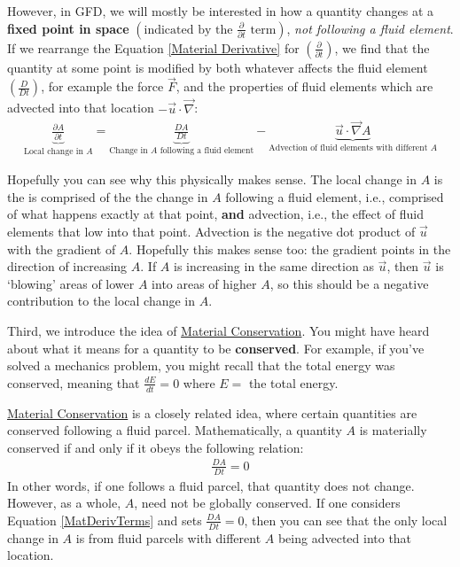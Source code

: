 However, in GFD, we will mostly be interested in how a quantity changes at a \textbf{fixed point in space} $\left(\text{indicated by the } \frac{\partial}{\partial t} \text{ term}\right)$, \textit{not following a fluid element}. If we rearrange the Equation \ref{Material Derivative} for $\left( \frac{\partial}{\partial t} \right)$, we find that the quantity at some point is modified by both whatever affects the fluid element $\left( \frac{D}{D t} \right)$, for example the force $\vec{F}$, and the properties of fluid elements which are advected into that location $-\vec{u}\cdot\vec{\nabla}$:
\begin{align}\label{MatDerivTerms}
    \underbrace{\frac{\partial A}{\partial t}}_{\text{Local change in }A}=
    \underbrace{\frac{DA}{Dt}}_{{\text{Change in }A \text{ following a fluid element}}}-
    \underbrace{\vec{u}\cdot\vec{\nabla}A}_{\text{Advection of fluid elements with different }A}
\end{align}

Hopefully you can see why this physically makes sense. The local change in $A$ is the is comprised of the the change in $A$ following a fluid element, i.e., comprised of what happens exactly at that point, \textbf{and} advection, i.e., the effect of fluid elements that low into that point. Advection is the negative dot product of $\vec{u}$ with the gradient of $A$. Hopefully this makes sense too: the gradient points in the direction of increasing $A$. If $A$ is increasing in the same direction as $\vec{u}$, then $\vec{u}$ is `blowing' areas of lower $A$ into areas of higher $A$, so this should be a negative contribution to the local change in $A$.

Third, we introduce the idea of \hyperref[Material Conservation]{Material Conservation}. You might have heard about what it means for a quantity to be \textbf{conserved}. For example, if you've solved a mechanics problem, you might recall that the total energy was conserved, meaning that $\frac{dE}{dt}=0$ where $E=$ the total energy.

\hyperref[Material Conservation]{Material Conservation} is a closely related idea, where certain quantities are conserved following a fluid parcel. Mathematically, a quantity $A$ is materially conserved if and only if it obeys the following relation:
\begin{align}\label{Material Conservation}
    \frac{D A}{Dt }=0
\end{align}
In other words, if one follows a fluid parcel, that quantity does not change. However, as a whole, $A$, need not be globally conserved. If one considers Equation \ref{MatDerivTerms} and sets $\frac{D A}{Dt }=0$, then you can see that the only local change in $A$ is from fluid parcels with different $A$ being advected into that location.

